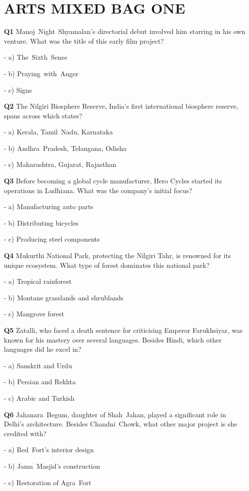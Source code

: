 \section{ARTS MIXED BAG ONE}

\textbf{Q1} Manoj Night Shyamalan's directorial debut involved him starring in his own venture. What was the title of this early film project?\par
\quad - a) The Sixth Sense\par
\quad - b) Praying with Anger\par
\quad - c) Signs\par

\textbf{Q2} The Nilgiri Biosphere Reserve, India's first international biosphere reserve, spans across which states?\par
\quad - a) Kerala, Tamil Nadu, Karnataka\par
\quad - b) Andhra Pradesh, Telangana, Odisha\par
\quad - c) Maharashtra, Gujarat, Rajasthan\par

\textbf{Q3} Before becoming a global cycle manufacturer, Hero Cycles started its operations in Ludhiana. What was the company's initial focus?\par
\quad - a) Manufacturing auto parts\par
\quad - b) Distributing bicycles\par
\quad - c) Producing steel components\par

\textbf{Q4} Mukurthi National Park, protecting the Nilgiri Tahr, is renowned for its unique ecosystem. What type of forest dominates this national park?\par
\quad - a) Tropical rainforest\par
\quad - b) Montane grasslands and shrublands\par
\quad - c) Mangrove forest\par

\textbf{Q5} Zatalli, who faced a death sentence for criticising Emperor Farukhsiyar, was known for his mastery over several languages. Besides Hindi, which other languages did he excel in?\par
\quad - a) Sanskrit and Urdu\par
\quad - b) Persian and Rekhta\par
\quad - c) Arabic and Turkish\par

\textbf{Q6} Jahanara Begum, daughter of Shah Jahan, played a significant role in Delhi's architecture. Besides Chandni Chowk, what other major project is she credited with?\par
\quad - a) Red Fort's interior design\par
\quad - b) Jama Masjid's construction\par
\quad - c) Restoration of Agra Fort\par

